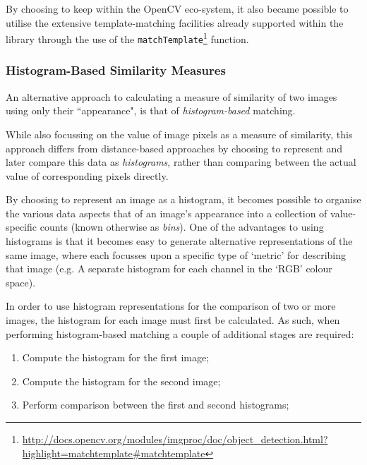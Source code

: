 By choosing to keep within the OpenCV eco-system, it also became possible to utilise the extensive template-matching facilities already supported within the library through the use of the \texttt{matchTemplate}\footnote{\url{http://docs.opencv.org/modules/imgproc/doc/object_detection.html?highlight=matchtemplate#matchtemplate}} function.

%
%

\subsubsection{Histogram-Based Similarity Measures}

An alternative approach to calculating a measure of similarity of two images using only their ``appearance", is that of \textit{histogram-based} matching.

While also focussing on the value of image pixels as a measure of similarity, this approach differs from distance-based approaches by choosing to represent and later compare this data as \textit{histograms}, rather than comparing between the actual value of corresponding pixels directly.

By choosing to represent an image as a histogram, it becomes possible to organise the various data aspects that of an image's appearance into a collection of value-specific counts (known otherwise as \textit{bins}). One of the advantages to using histograms is that it becomes easy to generate alternative representations of the same image, where each focusses upon a specific type of `metric' for describing that image (e.g. A separate histogram for each channel in the `RGB' colour space). 

In order to use histogram representations for the comparison of two or more images, the histogram for each image must first be calculated. As such, when performing histogram-based matching a couple of additional stages are required:

\begin{enumerate}
	\item Compute the histogram for the first image;
	\item Compute the histogram for the second image;
	\item Perform comparison between the first and second histograms;
\end{enumerate}

